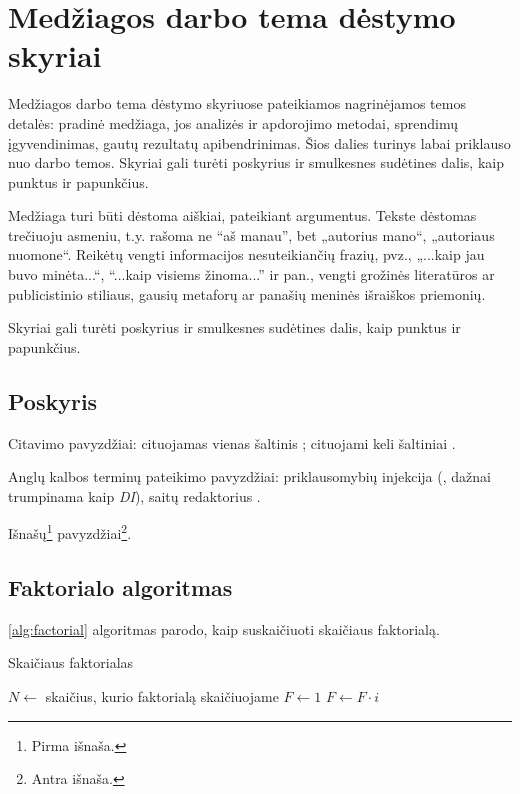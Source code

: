 \documentclass[
    english, %
]{VUMIFPSkursinis}
\begin{document}
\section{Medžiagos darbo tema dėstymo skyriai}
Medžiagos darbo tema dėstymo skyriuose pateikiamos nagrinėjamos temos detalės:
pradinė medžiaga, jos analizės ir apdorojimo metodai, sprendimų įgyvendinimas,
gautų rezultatų apibendrinimas. Šios dalies turinys labai priklauso nuo darbo
temos. Skyriai gali turėti poskyrius ir smulkesnes sudėtines dalis, kaip
punktus ir papunkčius.

Medžiaga turi būti dėstoma aiškiai, pateikiant argumentus. Tekste dėstomas
trečiuoju asmeniu, t.y. rašoma ne \enquote{aš manau}, bet „autorius mano“, „autoriaus
nuomone“. Reikėtų vengti informacijos nesuteikiančių frazių, pvz., „...kaip jau
buvo minėta...“, \enquote{...kaip visiems žinoma...} ir pan., vengti grožinės
literatūros ar publicistinio stiliaus, gausių metaforų ar panašių meninės
išraiškos priemonių.

Skyriai gali turėti poskyrius ir smulkesnes sudėtines dalis, kaip punktus ir
papunkčius.

\subsection{Poskyris}
Citavimo pavyzdžiai: cituojamas vienas šaltinis \cite{PvzStraipsnLt}; cituojami
keli šaltiniai \cite{PvzStraipsnEn, PvzStraipsnLta, PvzKonfLt, PvzKonfEn, PvzKnygLt, PvzKnygEn,
PvzElPubLt, PvzElPubEn, PvzBakLt, PvzMagistrLt, PvzPhdEn}.

Anglų kalbos terminų pateikimo pavyzdžiai: priklausomybių injekcija (,
dažnai trumpinama kaip \textit{DI}), saitų redaktorius .

Išnašų\footnote{Pirma išnaša.} pavyzdžiai\footnote{Antra išnaša.}.

\subsection{Faktorialo algoritmas}

\ref{alg:factorial} algoritmas parodo, kaip suskaičiuoti skaičiaus faktorialą.

\begin{algorithm}
\caption{Skaičiaus faktorialas}
\begin{algorithmic}[1] %
\State $N\gets$ skaičius, kurio faktorialą skaičiuojame
\State $F\gets 1$
    \State $F\gets F \cdot i$
\EndFor
\end{algorithmic}
\label{alg:factorial}
\end{algorithm}
\end{document}
